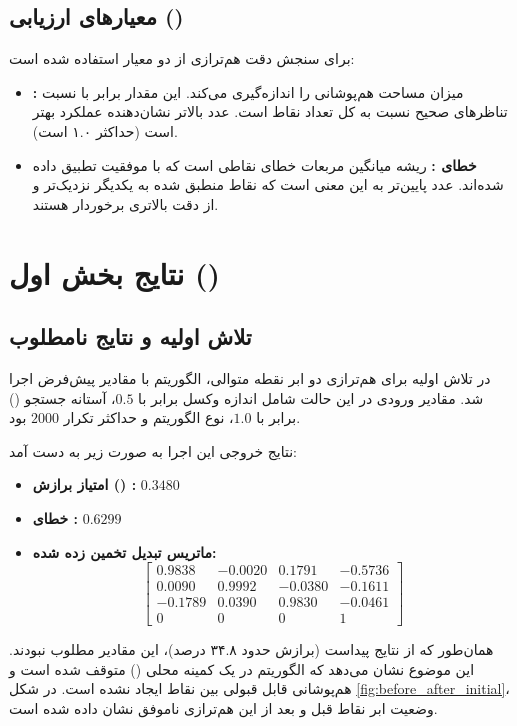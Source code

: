 \documentclass[12pt,a4paper]{article}
\begin{document}
	\subsection{معیارهای ارزیابی ()}
	برای سنجش دقت هم‌ترازی از دو معیار استفاده شده است:
	\begin{itemize}
		\item \textbf{ :} میزان مساحت هم‌پوشانی را اندازه‌گیری می‌کند. این مقدار برابر با نسبت تناظرهای صحیح نسبت به کل تعداد نقاط است. عدد بالاتر نشان‌دهنده عملکرد بهتر است (حداکثر ۱.۰ است).
		\item \textbf{خطای  :} ریشه میانگین مربعات خطای نقاطی است که با موفقیت تطبیق داده شده‌اند. عدد پایین‌تر به این معنی است که نقاط منطبق شده به یکدیگر نزدیک‌تر و از دقت بالاتری برخوردار هستند.
	\end{itemize}

\section{نتایج بخش اول ()}

\subsection{تلاش اولیه و نتایج نامطلوب}
در تلاش اولیه برای هم‌ترازی دو ابر نقطه متوالی، الگوریتم با مقادیر پیش‌فرض اجرا شد. مقادیر ورودی در این حالت شامل اندازه وکسل برابر با $0.5$، آستانه جستجو () برابر با $1.0$، نوع الگوریتم  و حداکثر تکرار $2000$ بود.

نتایج خروجی این اجرا به صورت زیر به دست آمد:
\begin{itemize}
	\item \textbf{امتیاز برازش () :} $0.3480$
	\item \textbf{خطای  :} $0.6299$
	\item \textbf{ماتریس تبدیل تخمین زده شده:}
	$$
	\begin{bmatrix}
		0.9838 & -0.0020 & 0.1791 & -0.5736 \\
		0.0090 &  0.9992 & -0.0380 & -0.1611 \\
		-0.1789 &  0.0390 & 0.9830 & -0.0461 \\
		0 & 0 & 0 & 1
	\end{bmatrix}
	$$
\end{itemize}

همان‌طور که از نتایج پیداست (برازش حدود ۳۴.۸ درصد)، این مقادیر مطلوب نبودند. این موضوع نشان می‌دهد که الگوریتم در یک کمینه محلی () متوقف شده است و هم‌پوشانی قابل قبولی بین نقاط ایجاد نشده است. در شکل \ref{fig:before_after_initial}، وضعیت ابر نقاط قبل و بعد از این هم‌ترازی ناموفق نشان داده شده است.
\end{document}

